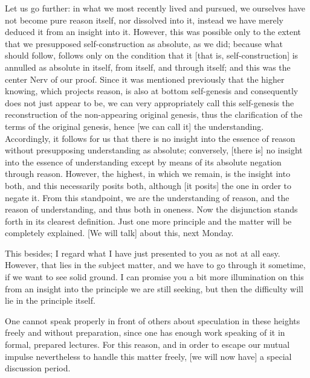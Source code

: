 Let us go further:
in what we most recently lived and pursued,
we ourselves have not become pure reason itself,
nor dissolved into it, instead we have merely
deduced it from an insight into it.
However, this was possible only to the extent
that we presupposed self-construction as absolute, as we did;
because what should follow, follows only
on the condition that it [that is, self-construction] is
annulled as absolute in itself, from itself, and through itself;
and this was the center {Nerv} of our proof.
Since it was mentioned previously that the higher knowing,
which projects reason, is also at bottom self-genesis
and consequently does not just appear to be,
we can very appropriately call this self-genesis
the reconstruction of the non-appearing original genesis,
thus the clarification of the terms of the original genesis,
hence [we can call it] the understanding.
Accordingly, it follows for us that
there is no insight into the essence of reason
without presupposing understanding as absolute;
conversely, [there is] no insight into
the essence of understanding except by
means of its absolute negation through reason.
However, the highest, in which we remain,
is the insight into both,
and this necessarily posits both,
although [it posits] the one in order to negate it.
From this standpoint, we are the understanding of reason,
and the reason of understanding, and thus both in oneness.
Now the disjunction stands forth in its clearest definition.
Just one more principle and the matter will be completely explained.
[We will talk] about this, next Monday.

This besides; I regard what I have just
presented to you as not at all easy.
However, that lies in the subject matter,
and we have to go through it sometime,
if we want to see solid ground.
I can promise you a bit more illumination on this
from an insight into the principle we are still seeking,
but then the difficulty will lie in the principle itself.

One cannot speak properly in front of others about
speculation in these heights freely and without preparation,
since one has enough work speaking of it in formal, prepared lectures.
For this reason, and in order to escape our mutual impulse
nevertheless to handle this matter freely,
[we will now have] a special discussion period.
